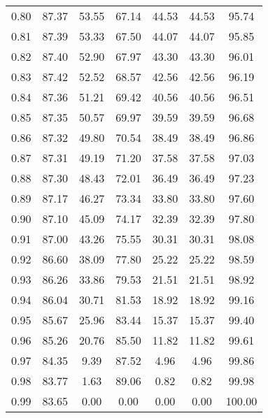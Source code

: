 \begin{tabular}{|c|c|c|c|c|c|c|}
      0.80 &     87.37 &     53.55 &      67.14 &   44.53 &      44.53 &         95.74 \\
      0.81 &     87.39 &     53.33 &      67.50 &   44.07 &      44.07 &         95.85 \\
      0.82 &     87.40 &     52.90 &      67.97 &   43.30 &      43.30 &         96.01 \\
      0.83 &     87.42 &     52.52 &      68.57 &   42.56 &      42.56 &         96.19 \\
      0.84 &     87.36 &     51.21 &      69.42 &   40.56 &      40.56 &         96.51 \\
      0.85 &     87.35 &     50.57 &      69.97 &   39.59 &      39.59 &         96.68 \\
      0.86 &     87.32 &     49.80 &      70.54 &   38.49 &      38.49 &         96.86 \\
      0.87 &     87.31 &     49.19 &      71.20 &   37.58 &      37.58 &         97.03 \\
      0.88 &     87.30 &     48.43 &      72.01 &   36.49 &      36.49 &         97.23 \\
      0.89 &     87.17 &     46.27 &      73.34 &   33.80 &      33.80 &         97.60 \\
      0.90 &     87.10 &     45.09 &      74.17 &   32.39 &      32.39 &         97.80 \\
      0.91 &     87.00 &     43.26 &      75.55 &   30.31 &      30.31 &         98.08 \\
      0.92 &     86.60 &     38.09 &      77.80 &   25.22 &      25.22 &         98.59 \\
      0.93 &     86.26 &     33.86 &      79.53 &   21.51 &      21.51 &         98.92 \\
      0.94 &     86.04 &     30.71 &      81.53 &   18.92 &      18.92 &         99.16 \\
      0.95 &     85.67 &     25.96 &      83.44 &   15.37 &      15.37 &         99.40 \\
      0.96 &     85.26 &     20.76 &      85.50 &   11.82 &      11.82 &         99.61 \\
      0.97 &     84.35 &      9.39 &      87.52 &    4.96 &       4.96 &         99.86 \\
      0.98 &     83.77 &      1.63 &      89.06 &    0.82 &       0.82 &         99.98 \\
      0.99 &     83.65 &      0.00 &       0.00 &    0.00 &       0.00 &        100.00 \\
\bottomrule
\end{tabular}
